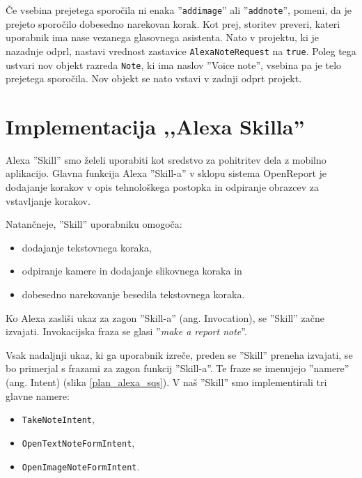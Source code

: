 \documentclass[a4paper, 12pt]{book}
\begin{document}
Če vsebina prejetega sporočila ni enaka ''\texttt{addimage}'' ali ''\texttt{addnote}'', pomeni, da je prejeto sporočilo dobesedno narekovan korak.
Kot prej, storitev preveri, kateri uporabnik ima nase vezanega glasovnega asistenta.
Nato v projektu, ki je nazadnje odprl, nastavi vrednost zastavice \texttt{AlexaNoteRequest} na \texttt{true}.
Poleg tega ustvari nov objekt razreda \texttt{Note}, ki ima naslov ''Voice note'', vsebina pa je telo prejetega sporočila.
Nov objekt se nato vstavi v zadnji odprt projekt.



\section{Implementacija ,,Alexa Skilla''}

Alexa ''Skill'' smo želeli uporabiti kot sredstvo za pohitritev dela z mobilno aplikacijo.
Glavna funkcija Alexa ''Skill-a'' v sklopu sistema OpenReport je dodajanje korakov v opis tehnološkega postopka in odpiranje obrazcev za vstavljanje korakov.

\noindent Natančneje, ''Skill'' uporabniku omogoča:
\begin{itemize}
	\item dodajanje tekstovnega koraka,
	\item odpiranje kamere in dodajanje slikovnega koraka in
	\item dobesedno narekovanje besedila tekstovnega koraka.
\end{itemize}




Ko Alexa zasliši ukaz za zagon ''Skill-a'' (ang. Invocation), se ''Skill'' začne izvajati.
Invokacijska fraza se glasi ''\textit{make a report note}''.

Vsak nadaljnji ukaz, ki ga uporabnik izreče, preden se ''Skill'' preneha izvajati, se bo primerjal s frazami za zagon funkcij ''Skill-a''.
Te fraze se imenujejo ''namere'' (ang. Intent) (slika \ref{plan_alexa_sqs}).
V naš ''Skill'' smo implementirali tri glavne namere:

\begin{itemize}
	\item \texttt{TakeNoteIntent},
	\item \texttt{OpenTextNoteFormIntent},
	\item \texttt{OpenImageNoteFormIntent}.
\end{itemize}
\end{document}
